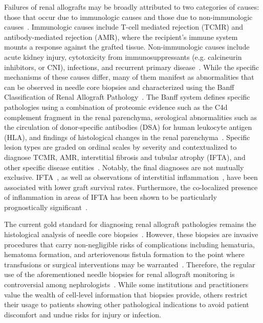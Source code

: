 Failures of renal allografts may be broadly attributed to two categories of causes: those that occur due to immunologic causes and those due to non-immunologic causes~\cite{saritas_Kidney_2021}. Immunologic causes include T-cell mediated rejection (TCMR) and antibody-mediated rejection (AMR), where the recipient's immune system mounts a response against the grafted tissue. Non-immunologic causes include acute kidney injury, cytotoxicity from immunosuppressants (e.g. calcineurin inhibitors, or CNI), infections, and recurrent primary disease~\cite{saritas_Kidney_2021,naesens_Banff_2024}. While the specific mechanisms of these causes differ, many of them manifest as abnormalities that can be observed in needle core biopsies and characterized using the Banff Classification of Renal Allograft Pathology~\cite{loupy_Banff_2020,naesens_Banff_2024}. The Banff system defines specific pathologies using a combination of proteomic evidence such as the C4d complement fragment in the renal parenchyma, serological abnormalities such as the circulation of donor-specific antibodies (DSA) for human leukocyte antigen (HLA), and findings of histological changes in the renal parenchyma~\cite{alexandre_AntibodyMediated_2018}. Specific lesion types are graded on ordinal scales by severity and contextualized to diagnose TCMR, AMR, interstitial fibrosis and tubular atrophy (IFTA), and other specific disease entities~\cite{naesens_Banff_2024}. Notably, the final diagnoses are not mutually exclusive. IFTA~\cite{saritas_Kidney_2021}, as well as observations of interstitial inflammation~\cite{mannon_Inflammation_2010}, have been associated with lower graft survival rates. Furthermore, the co-localized presence of inflammation in areas of IFTA has been shown to be particularly prognostically significant~\cite{gago_Kidney_2012,nankivell_causes_2018}.

The current gold standard for diagnosing renal allograft pathologies remains the histological analysis of needle core biopsies~\cite{naesens_Banff_2024}. However, these biopsies are invasive procedures that carry non-negligible risks of complications including hematuria, hematoma formation, and arteriovenous fistula formation to the point where transfusions or surgical interventions may be warranted~\cite{geddes_Major_2025,ho_Complications_2022,morgan_Complications_2016}. Therefore, the regular use of the aforementioned needle biopsies for renal allograft monitoring is controversial among nephrologists~\cite{schinstock_Value_2017}. While some institutions and practitioners value the wealth of cell-level information that biopsies provide, others restrict their usage to patients showing other pathological indications to avoid patient discomfort and undue risks for injury or infection.

